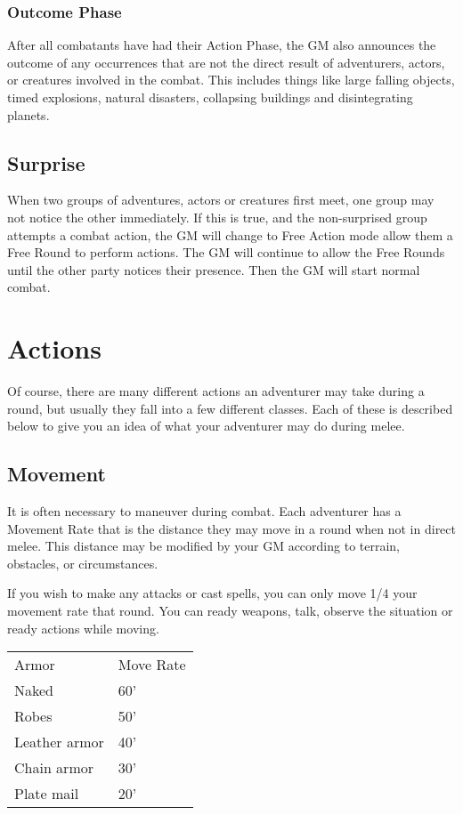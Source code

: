 \begin{multicols*}{2}
\subsubsection{Outcome Phase}
After all combatants have had their Action Phase, the GM also announces the outcome of any occurrences that are not the direct result of adventurers, actors, or creatures involved in the combat. This includes things like large falling objects, timed explosions, natural disasters, collapsing buildings and disintegrating planets.
\subsection{Surprise}
When two groups of adventures, actors or creatures first meet, one group may not notice the other immediately. If this is true, and the non-surprised group attempts a combat
action, the GM will change to Free Action mode allow them a Free Round to perform actions. The GM will continue to allow the Free Rounds until the other party notices their presence. Then the GM will start normal combat.
\section{Actions}
Of course, there are many different actions an adventurer may take during a round, but usually they fall into a few different classes. Each of these is described below to give you an idea of what your adventurer may do during melee.
\subsection{Movement}
\setlength{\columnsep}{0.25cm}
\begin{multicols*}{2}
It is often necessary to maneuver during combat. Each adventurer has a Movement Rate that is the distance they may move in a round when not in direct melee. This distance may be modified by your GM according to terrain, obstacles, or circumstances.

If you wish to make any attacks or cast spells, you can only move 1/4 your movement rate that round. You can ready weapons, talk, observe the situation or ready actions while moving.
\begin{normbox}
\begin{tabular}{@{}l l}
Armor & Move Rate\\
Naked & 60'\\
Robes & 50'\\
Leather armor & 40'\\
Chain armor & 30'\\
Plate mail & 20'\\
\end{tabular}
\end{normbox}


\end{multicols*}
\end{multicols*}
